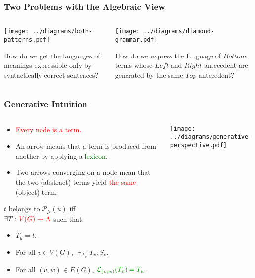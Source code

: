 \documentclass{beamer}
\begin{document}
\begin{frame}
  \frametitle{Two Problems with the Algebraic View}

  \begin{columns}[t]
    \begin{column}{0.5\textwidth}
      \texttt{[image: ../diagrams/both-patterns.pdf]}

      How do we get the languages of meanings expressible only by
      syntactically correct sentences?
    \end{column}
    \begin{column}{0.5\textwidth}
      \texttt{[image: ../diagrams/diamond-grammar.pdf]}

      How do we express the language of $Bottom$ terms whose $Left$ and
      $Right$ antecedent are generated by the same $Top$ antecedent?
    \end{column}
  \end{columns}
\end{frame}


\begin{frame}
  \frametitle{Generative Intuition}

  \begin{columns}[c]
    \begin{column}{0.7\textwidth}
      \begin{itemize}
      \item \textcolor{red}{Every node is a term.}
      \item An arrow means that a term is produced from another by
        applying a \textcolor{darkgreen}{lexicon}.
      \item Two arrows converging on a node mean that the two (abstract)
        terms yield \textcolor{red}{the same} (object) term.
      \end{itemize}

      \vspace{3 mm}

      $t$ belongs to $\mathcal{P}_{\mathcal{G}}(u)$ iff \\$\exists T :
      \textcolor{red}{V(G) \to \Lambda}$ such that:
      \begin{itemize}
      \item $T_u = t$.
      \item For all $v \in V(G)$, $\vdash_{\Sigma_v} T_v : S_v$.
      \item For all $(v,w) \in E(G)$,
        $\textcolor{darkgreen}{\mathcal{L}_{(v,w)}(T_v) = T_w}$.
      \end{itemize}
    \end{column}
    \begin{column}{0.3\textwidth}
      \texttt{[image: ../diagrams/generative-perspective.pdf]}
    \end{column}
  \end{columns}
\end{frame}
\end{document}
